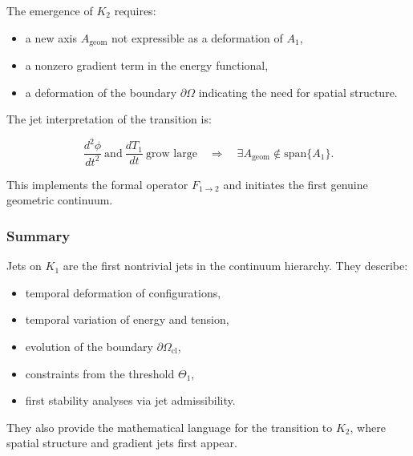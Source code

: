 The emergence of $K_2$ requires:

\begin{itemize}
    \item a new axis $A_{\mathrm{geom}}$ not expressible as a
    deformation of $A_1$,
    \item a nonzero gradient term in the energy functional,
    \item a deformation of the boundary $\partial\Omega$ indicating the
    need for spatial structure.
\end{itemize}

The jet interpretation of the transition is:

\[
\frac{d^2\phi}{dt^2} \ \text{and}\
\frac{dT_1}{dt}\ \text{grow large}
\quad\Longrightarrow\quad
\exists A_{\mathrm{geom}}\notin \text{span}\{A_1\}.
\]

This implements the formal operator $F_{1\to2}$ and initiates the first
genuine geometric continuum.



\subsubsection{Summary}

Jets on $K_1$ are the first nontrivial jets in the continuum hierarchy.
They describe:

\begin{itemize}
    \item temporal deformation of configurations,
    \item temporal variation of energy and tension,
    \item evolution of the boundary $\partial\Omega_{\mathrm{cl}}$,
    \item constraints from the threshold $\Theta_1$,
    \item first stability analyses via jet admissibility.
\end{itemize}

They also provide the mathematical language for the transition to $K_2$,
where spatial structure and gradient jets first appear.
